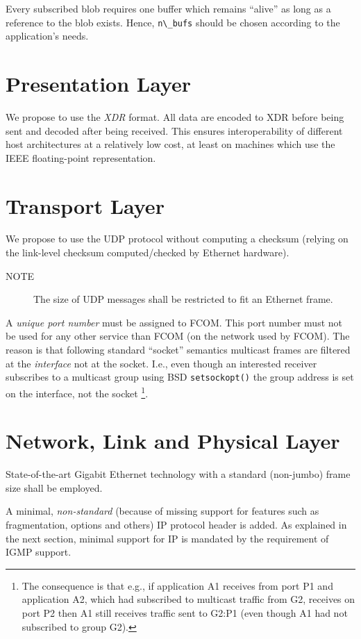 \documentclass[11pt]{article}
\newcommand{\fcom}{FCOM}
\newcommand{\blob}{blob}
\newcommand{\cstl}[1]{{\lstinline+#1+}}
\newcommand{\note}[1]{
	\begin{description}
		\item[NOTE] #1
	\end{description}
}
\begin{document}
      Every subscribed \blob{} requires one buffer
      which remains ``alive'' as long as a reference
      to the \blob{} exists. Hence, \cstl{n\_bufs}
      should be chosen according to the application's
      needs.
     
\section{Presentation Layer}
We propose to use the {\em XDR} format. All data are encoded
to XDR before being sent and decoded after being received.
This ensures interoperability of different host architectures
at a relatively low cost, at least on machines which use the
IEEE floating-point representation.

\section{Transport Layer}
We propose to use the UDP protocol without computing a checksum
(relying on the link-level checksum computed/checked by Ethernet hardware).

\note{The size of UDP messages shall be restricted to
fit an Ethernet frame.}

A {\em unique port number} must be assigned to \fcom{}. This port
number must not be used for any other service than \fcom{}
(on the network used by \fcom{}).
The reason is that following standard ``socket'' semantics
multicast frames are filtered at the {\em interface} not at the
socket. I.e., even though an interested receiver subscribes
to a multicast group using BSD {\tt setsockopt()} the
group address is set on the interface, not the socket%
\footnote{
The consequence is that e.g., if application A1 receives
from port P1 and application A2, which
had subscribed to multicast traffic from G2, receives on
port P2 then A1 still receives traffic sent to G2:P1
(even though A1 had not subscribed to group G2).
}.

\section{Network, Link and Physical Layer}
State-of-the-art Gigabit Ethernet technology with a
standard (non-jumbo) frame size shall be employed.

A minimal, {\em non-standard} (because of missing support for
features such as fragmentation, options and others) IP protocol
header is added. As explained in the next section, minimal support
for IP is mandated by the requirement of IGMP support.
\end{document}
